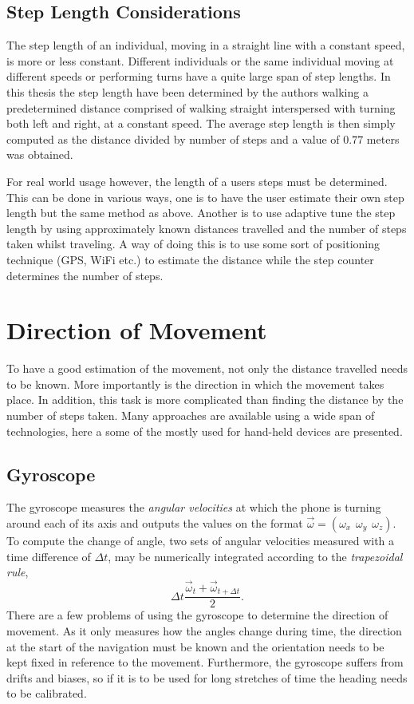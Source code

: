 \documentclass{LTHthesis}
\begin{document}
\subsection{Step Length Considerations}
%
The step length of an individual, moving in a straight line with a constant speed, is more or less constant. Different individuals or the same individual moving at different speeds or performing turns have a quite large span of step lengths. In this thesis the step length have been determined by the authors walking a predetermined distance comprised of walking straight interspersed with turning both left and right, at a constant speed. The average step length is then simply computed as the distance divided by number of steps and a value of $0.77$ meters was obtained.  

For real world usage however, the length of a users steps must be determined. This can be done in various ways, one is to have the user estimate their own step length but the same method as above. Another is to use adaptive tune the step length by using approximately known distances travelled and the number of steps taken whilst traveling. A way of doing this is to use some sort of positioning technique (GPS, WiFi etc.) to estimate the distance while the step counter determines the number of steps.      
%
\section{Direction of Movement}
%
To have a good estimation of the movement, not only the distance travelled needs to be known. More importantly is the direction in which the movement takes place. In addition, this task is more complicated than finding the distance by the number of steps taken. Many approaches are available using a wide span of technologies, here a some of the mostly used for hand-held devices are presented.  
%
\subsection{Gyroscope}
%
The gyroscope measures the \emph{angular velocities} at which the phone is turning around each of its axis and outputs the values on the format $\vec\omega = (\omega_x \hspace{5pt} \omega_y \hspace{5pt} \omega_z)$. To compute the change of angle, two sets of angular velocities measured with a time difference of $\Delta t$, may be numerically integrated according to the \emph{trapezoidal rule}, 
\begin{equation}
\Delta t \frac{\vec \omega _t +\vec \omega _{t+\Delta t}}{2}.
\end{equation} 
%
There are a few problems of using the gyroscope to determine the direction of movement. As it only measures how the angles change during time, the direction at the start of the navigation must be known and the orientation needs to be kept fixed in reference to the movement. Furthermore, the gyroscope suffers from drifts and biases, so if it is to be used for long stretches of time the heading needs to be calibrated. 
%
\end{document}
